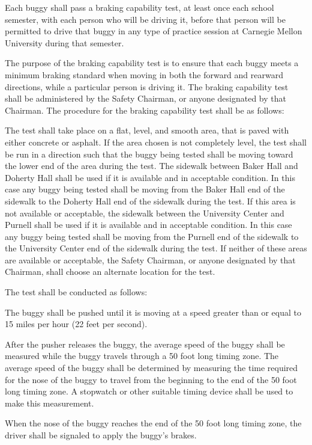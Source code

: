 Each buggy shall pass a braking capability test, at least once each school semester, with each person who will be driving it, before that person will be permitted to drive that buggy in any type of practice session at Carnegie Mellon University during that semester.

The purpose of the braking capability test is to ensure that each buggy meets a minimum braking standard when moving in both the forward and rearward directions, while a particular person is driving it. The braking capability test shall be administered by the Safety Chairman, or anyone designated by that Chairman. The procedure for the braking capability test shall be as follows:

The test shall take place on a flat, level, and smooth area, that is paved with either concrete or asphalt. If the area chosen is not completely level, the test shall be run in a direction such that the buggy being tested shall be moving toward the lower end of the area during the test. The sidewalk between Baker Hall and Doherty Hall shall be used if it is available and in acceptable condition. In this case any buggy being tested shall be moving from the Baker Hall end of the sidewalk to the Doherty Hall end of the sidewalk during the test. If this area is not available or acceptable, the sidewalk between the University Center and Purnell shall be used if it is available and in acceptable condition. In this case any buggy being tested shall be moving from the Purnell end of the sidewalk to the University Center end of the sidewalk during the test. If neither of these areas are available or acceptable, the Safety Chairman, or anyone designated by that Chairman, shall choose an alternate location for the test.

The test shall be conducted as follows:

The buggy shall be pushed until it is moving at a speed greater than or equal to 15 miles per hour (22 feet per second).

After the pusher releases the buggy, the average speed of the buggy shall be measured while the buggy travels through a 50 foot long timing zone. The average speed of the buggy shall be determined by measuring the time required for the nose of the buggy to travel from the beginning to the end of the 50 foot long timing zone. A stopwatch or other suitable timing device shall be used to make this measurement.

When the nose of the buggy reaches the end of the 50 foot long timing zone, the driver shall be signaled to apply the buggy's brakes.


